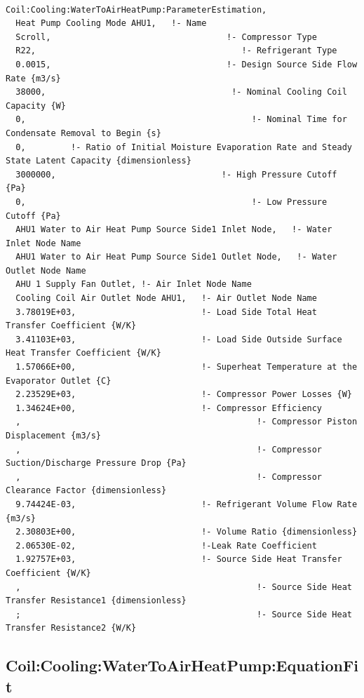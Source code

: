\begin{lstlisting}

Coil:Cooling:WaterToAirHeatPump:ParameterEstimation,
  Heat Pump Cooling Mode AHU1,   !- Name
  Scroll,                                   !- Compressor Type
  R22,                                         !- Refrigerant Type
  0.0015,                                   !- Design Source Side Flow Rate {m3/s}
  38000,                                     !- Nominal Cooling Coil Capacity {W}
  0,                                             !- Nominal Time for Condensate Removal to Begin {s}
  0,         !- Ratio of Initial Moisture Evaporation Rate and Steady State Latent Capacity {dimensionless}
  3000000,                                 !- High Pressure Cutoff {Pa}
  0,                                             !- Low Pressure Cutoff {Pa}
  AHU1 Water to Air Heat Pump Source Side1 Inlet Node,   !- Water Inlet Node Name
  AHU1 Water to Air Heat Pump Source Side1 Outlet Node,   !- Water Outlet Node Name
  AHU 1 Supply Fan Outlet, !- Air Inlet Node Name
  Cooling Coil Air Outlet Node AHU1,   !- Air Outlet Node Name
  3.78019E+03,                         !- Load Side Total Heat Transfer Coefficient {W/K}
  3.41103E+03,                         !- Load Side Outside Surface Heat Transfer Coefficient {W/K}
  1.57066E+00,                         !- Superheat Temperature at the Evaporator Outlet {C}
  2.23529E+03,                         !- Compressor Power Losses {W}
  1.34624E+00,                         !- Compressor Efficiency
  ,                                               !- Compressor Piston Displacement {m3/s}
  ,                                               !- Compressor Suction/Discharge Pressure Drop {Pa}
  ,                                               !- Compressor Clearance Factor {dimensionless}
  9.74424E-03,                         !- Refrigerant Volume Flow Rate {m3/s}
  2.30803E+00,                         !- Volume Ratio {dimensionless}
  2.06530E-02,                         !-Leak Rate Coefficient
  1.92757E+03,                         !- Source Side Heat Transfer Coefficient {W/K}
  ,                                               !- Source Side Heat Transfer Resistance1 {dimensionless}
  ;                                               !- Source Side Heat Transfer Resistance2 {W/K}
\end{lstlisting}

\subsection{Coil:Cooling:WaterToAirHeatPump:EquationFit}\label{coilcoolingwatertoairheatpumpequationfit}

